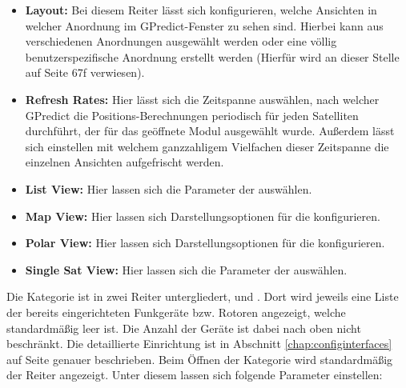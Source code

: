\begin{itemize}
	\parskip0pt
	\item \textbf{Layout:} Bei diesem Reiter lässt sich konfigurieren, welche Ansichten in welcher Anordnung im GPredict-Fenster zu sehen sind. Hierbei kann aus verschiedenen Anordnungen ausgewählt werden oder eine völlig benutzerspezifische Anordnung erstellt werden (Hierfür wird an dieser Stelle auf \cite{gpredictmanual} Seite 67f verwiesen).
	\item \textbf{Refresh Rates:} Hier lässt sich die Zeitspanne auswählen, nach  welcher GPredict die Positions-Berechnungen periodisch für jeden Satelliten durchführt, der für das geöffnete Modul ausgewählt wurde. Außerdem lässt sich einstellen mit welchem ganzzahligem Vielfachen dieser Zeitspanne die einzelnen Ansichten aufgefrischt werden.
	\item \textbf{List View:} Hier lassen sich die Parameter der  auswählen.
	\item \textbf{Map View:} Hier lassen sich Darstellungsoptionen für die  konfigurieren.
	\item \textbf{Polar View:} Hier lassen sich Darstellungsoptionen für die  konfigurieren.
	\item \textbf{Single Sat View:} Hier lassen sich die Parameter der  auswählen.
\end{itemize}

Die Kategorie  ist in zwei Reiter untergliedert,  und . Dort wird jeweils eine Liste der bereits eingerichteten Funkgeräte bzw. Rotoren angezeigt, welche standardmäßig leer ist. Die Anzahl der Geräte ist dabei nach oben nicht beschränkt. Die detaillierte Einrichtung ist in Abschnitt \ref{chap:configinterfaces} auf Seite \pageref{configinterfaces} genauer beschrieben.\newpar
Beim Öffnen der Kategorie  wird standardmäßig der Reiter  angezeigt. Unter diesem lassen sich folgende Parameter einstellen:

